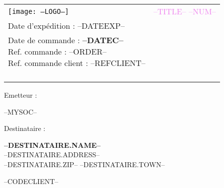 \newcommand{\FOOT}{--FOOT--\\
P\'enalit\'e pour paiement tardif : inter\^et l\'egal x3 et une indemnit\'e forfaitaire pour frais de recouvrement de 40 euros. R\`eglement anticip\'e, pas d'escompte.}

\newcommand{\specialcell}[2][c]{
	\parbox[#1]{5.8cm}{#2}}
	
\begin{tabular}{p{9cm} p{8cm}}
    \vspace{0pt} 
    \texttt{[image: --LOGO--]}
    & 
    \vspace{0pt}
   \raggedleft
	\textcolor{violet}{\textsc{\Large --TITLE-- --NUM--}}\\
	Date d'exp\'edition : --DATEEXP--\\
    {\small Date de commande : \textbf{--DATEC--}\\
	Ref. commande : --ORDER--\\
	Ref. commande client : --REFCLIENT--\\}~\\
\end{tabular}


\begin{minipage}[t]{0.40\textwidth}
{\small Emetteur :}\\
\begin{fminipage}
--MYSOC--
\end{fminipage}
\end{minipage}
\hspace{1cm}
\begin{minipage}[t]{0.52\textwidth}
{\small Destinataire :}

\begin{fminipage}
\textbf{\large --DESTINATAIRE.NAME--}\\
--DESTINATAIRE.ADDRESS--\\
\textsc{--DESTINATAIRE.ZIP-- --DESTINATAIRE.TOWN--}\\
\begin{minipage}{\textwidth}
\flushright
{\tiny --CODECLIENT--}
\end{minipage}
\end{fminipage}
\end{minipage}

\begin{minipage}[t]{0.60\textwidth}
\end{minipage}
\hspace{1cm}
\begin{minipage}[t]{0.32\textwidth}
\begin{flushright}
{\it Livraison : {--DELIVERYMODE--}\\
{\it Date prévisionnelle : \textbf{--DATEEXP--}\\
\vspace{1em}
{\footnotesize \textit{Montants exprimés en €}}
\end{flushright}
\end{minipage}

